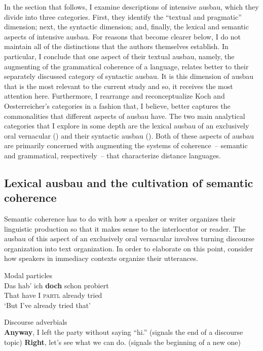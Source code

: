   In the section that follows, I examine  descriptions of intensive ausbau, which they divide into three categories. First, they identify the “textual and pragmatic” dimension; next, the syntactic dimension; and, finally, the lexical and semantic aspects of intensive ausbau. For reasons that become clearer below, I do not maintain all of the distinctions that the authors themselves establish. In particular, I conclude that one aspect of their textual ausbau, namely, the augmenting of the grammatical coherence of a language, relates better to their separately discussed category of syntactic ausbau. It is this dimension of ausbau that is the most relevant to the current study and so, it receives the most attention here. Furthermore, I rearrange and reconceptualize Koch and Oesterreicher’s categories in a fashion that, I believe, better captures the commonalities that different aspects of ausbau have. The two main analytical categories that I explore in some depth are the lexical ausbau of an exclusively oral vernacular () and their syntactic ausbau (). Both of these aspects of ausbau are primarily concerned with augmenting the systems of coherence~-- semantic and grammatical, respectively~-- that characterize distance languages.

\subsection{Lexical ausbau and the cultivation of semantic coherence}\label{sec:4.2.1}

  Semantic coherence has to do with how a speaker or writer organizes their linguistic production so that it makes sense to the interlocutor or reader. The ausbau of this aspect of an exclusively oral vernacular involves turning discourse organization into text organization. In order to elaborate on this point, consider how speakers in immediacy contexts organize their utterances.

\ea%
    \label{ex:4:1}
\ea Modal particles\\
\gll    Das      hab’    ich   \textbf{doch}   schon  probiert\\
    That  have   I   \textsc{partl}  already  tried\\
\glt     ‘But I’ve already tried that’

\ex Discourse adverbials\\
      \ea \textbf{Anyway}, I left the party without saying “hi.” (signals the end of a discourse topic)
      \ex \textbf{Right}, let’s see what we can do. (signals the beginning of a new one)
      \z
    \z
\z

